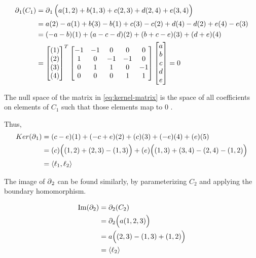 \begin{example}
    \begin{align}
        \operatorname{\partial}_1(C_1) &= \operatorname{\partial}_1\Big( a(1,2) + b(1,3) + c(2,3) + d(2,4) + e(3,4) \Big) \\
        &= a(2) - a(1) + b(3) - b(1) + c(3) - c(2) + d(4) - d(2) + e(4) - e(3)\\
        &= (-a - b)(1) + (a - c - d)(2) + (b + c - e)(3) + (d + e)(4) \\
        &=  \begin{bmatrix}
                (1)\\(2)\\(3)\\(4)\\
            \end{bmatrix}^T
            \begin{bmatrix}
                -1 & -1 &  0 &  0 &  0 \\
                1 &  0 & -1 & -1 &  0 \\
                0 &  1 &  1 &  0 & -1 \\
                0 &  0 &  0 &  1 &  1 \\
            \end{bmatrix}
            \begin{bmatrix}
                a\\b\\c\\d\\e\\
            \end{bmatrix}
        = 0 \label{eq:kernel-matrix}
    \end{align}

    The null space of the matrix in \eqref{eq:kernel-matrix} is the space of all coefficients on elements of \(C_1\) such that those elements map to 0 .

    Thus,
    \begin{align}
        Ker(\operatorname{\partial}_1) &= (c - e)(1) + (-c + e)(2) + (c)(3) + (-e)(4) + (e)(5)\\
            &= (c)\Big( (1,2) + (2,3) - (1,3)\Big) + (e)\Big((1,3) + (3,4) - (2,4) - (1,2)\Big) \\
            &= \langle \ell_1, \ell_2 \rangle
    \end{align}

    The image of \(\operatorname{\partial}_2\) can be found similarly, by parameterizing \(C_2\) and applying the boundary homomorphism.

    \begin{align}
        \operatorname{Im} (\partial_2)   &= \partial_2 (C_2) \\
            &= \partial_2 \Big( a(1,2,3) \Big) \\
            &= a\Big((2,3) - (1,3) + (1,2) \Big)\\
            &= \langle \ell_2 \rangle
    \end{align}
\end{example}




